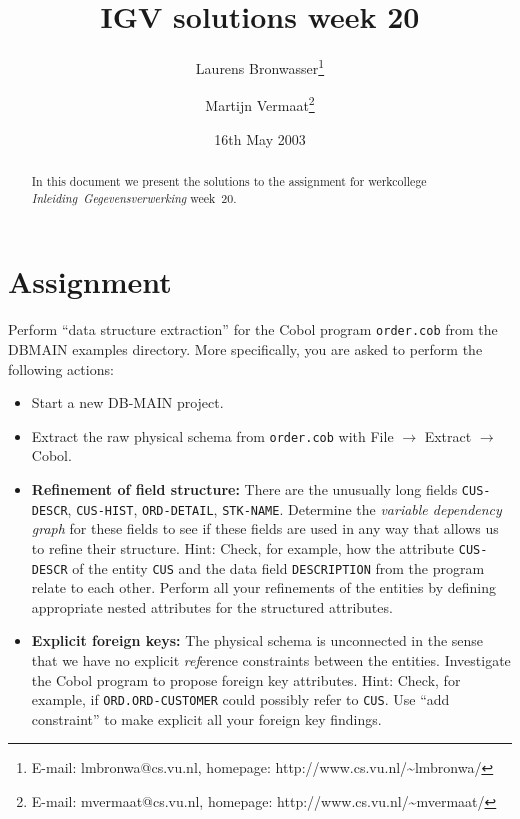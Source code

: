 \documentclass[11pt]{article}
\title{IGV solutions week 20}
\author{
	Laurens Bronwasser\footnote{E-mail: lmbronwa@cs.vu.nl, homepage: http://www.cs.vu.nl/\~{}lmbronwa/}
	\and
	Martijn Vermaat\footnote{E-mail: mvermaat@cs.vu.nl, homepage: http://www.cs.vu.nl/\~{}mvermaat/}
}
\date{16th May 2003}
\begin{document}
\maketitle

\begin{abstract}
In this document we present the solutions to the assignment for werkcollege \emph{\mbox{Inleiding Gegevensverwerking}} \mbox{week 20}.
\end{abstract}

\tableofcontents


\newpage

\section{Assignment}


Perform ``data structure extraction'' for the Cobol program \verb|order.cob| from the DBMAIN examples directory. More specifically, you are asked to perform the following actions:

\begin{itemize}

\item
Start a new DB-MAIN project.

\item
Extract the raw physical schema from \verb|order.cob| with File $\rightarrow$ Extract $\rightarrow$ Cobol.

\item
\textbf{Refinement of field structure:} There are the unusually long fields \verb|CUS-DESCR|, \verb|CUS-HIST|, \verb|ORD-DETAIL|, \verb|STK-NAME|. Determine the \emph{variable dependency graph} for these fields to see if these fields are used in any way that allows us to refine their structure. Hint: Check, for example, how the attribute \verb|CUS-DESCR| of the entity \verb|CUS| and the data field \verb|DESCRIPTION| from the program relate to each other. Perform all your refinements of the entities by defining appropriate nested attributes for the structured attributes.

\item
\textbf{Explicit foreign keys:} The physical schema is unconnected in the sense that we have no explicit \emph{ref}erence constraints between the entities. Investigate the Cobol program to propose foreign key attributes. Hint: Check, for example, if \verb|ORD.ORD-CUSTOMER| could possibly refer to \verb|CUS|. Use ``add constraint'' to make explicit all your foreign key findings.

\end{itemize}
\end{document}
